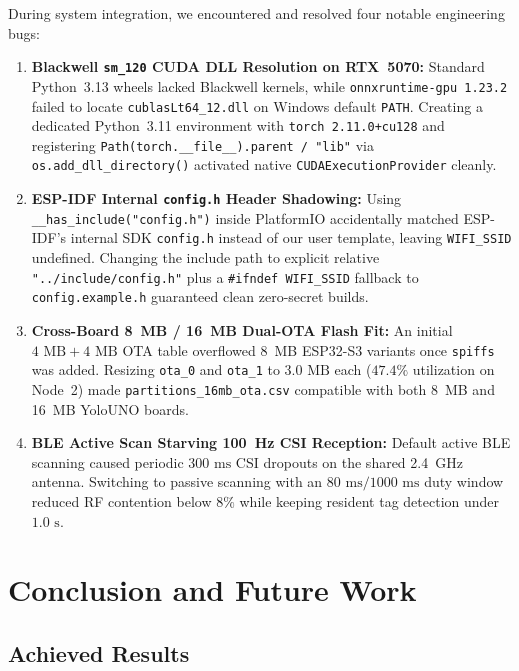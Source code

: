 \documentclass{hcmut-report}
\begin{document}
During system integration, we encountered and resolved four notable engineering bugs:
\begin{enumerate}
  \item \textbf{Blackwell \texttt{sm\_120} CUDA DLL Resolution on RTX~5070:} Standard Python~3.13 wheels lacked Blackwell kernels, while \texttt{onnxruntime-gpu 1.23.2} failed to locate \texttt{cublasLt64\_12.dll} on Windows default \texttt{PATH}. Creating a dedicated Python~3.11 environment with \texttt{torch 2.11.0+cu128} and registering \texttt{Path(torch.\_\_file\_\_).parent / "lib"} via \texttt{os.add\_dll\_directory()} activated native \texttt{CUDAExecutionProvider} cleanly.
  \item \textbf{ESP-IDF Internal \texttt{config.h} Header Shadowing:} Using \texttt{\_\_has\_include("config.h")} inside PlatformIO accidentally matched ESP-IDF's internal SDK \texttt{config.h} instead of our user template, leaving \texttt{WIFI\_SSID} undefined. Changing the include path to explicit relative \texttt{"../include/config.h"} plus a \texttt{\#ifndef WIFI\_SSID} fallback to \texttt{config.example.h} guaranteed clean zero-secret builds.
  \item \textbf{Cross-Board 8~MB / 16~MB Dual-OTA Flash Fit:} An initial $4\text{ MB} + 4\text{ MB}$ OTA table overflowed 8~MB ESP32-S3 variants once \texttt{spiffs} was added. Resizing \texttt{ota\_0} and \texttt{ota\_1} to $3.0\text{ MB}$ each ($47.4\%$ utilization on Node~2) made \texttt{partitions\_16mb\_ota.csv} compatible with both 8~MB and 16~MB YoloUNO boards.
  \item \textbf{BLE Active Scan Starving 100~Hz CSI Reception:} Default active BLE scanning caused periodic $300\text{ ms}$ CSI dropouts on the shared 2.4~GHz antenna. Switching to passive scanning with an $80\text{ ms} / 1000\text{ ms}$ duty window reduced RF contention below $8\%$ while keeping resident tag detection under $1.0\text{ s}$.
\end{enumerate}

\section[Conclusion and Future Work]{Conclusion and Future Work}
\label{sec:conclusion}

\subsection[Achieved Results]{Achieved Results}
\label{sec:achieved}
\end{document}
